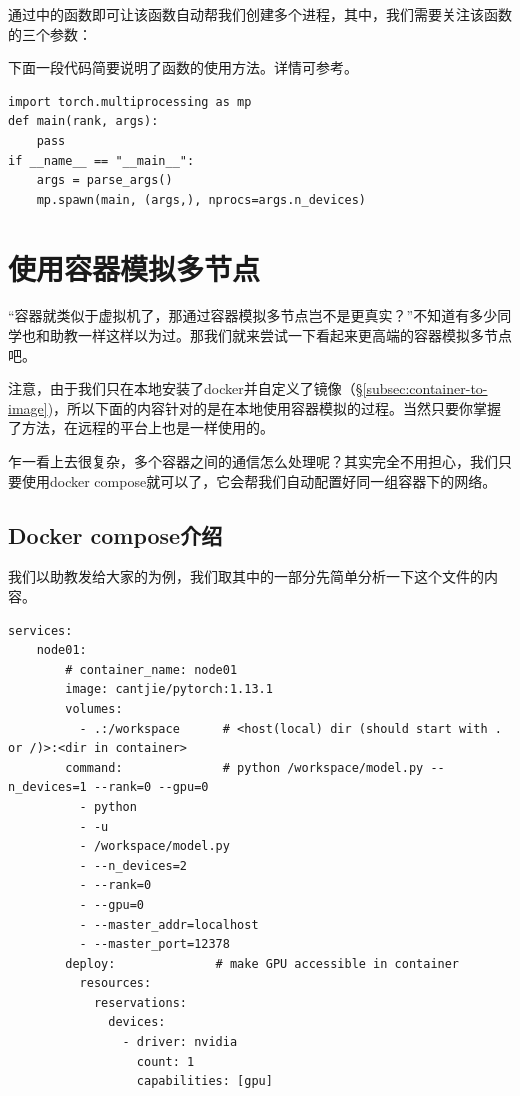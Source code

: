 通过中的函数即可让该函数自动帮我们创建多个进程，其中，我们需要关注该函数的三个参数：

下面一段代码简要说明了函数的使用方法。详情可参考。
\begin{lstlisting}
import torch.multiprocessing as mp
def main(rank, args):
    pass
if __name__ == "__main__":
    args = parse_args()
    mp.spawn(main, (args,), nprocs=args.n_devices)
\end{lstlisting}

\section{使用容器模拟多节点}

“容器就类似于虚拟机了，那通过容器模拟多节点岂不是更真实？”不知道有多少同学也和助教一样这样以为过。那我们就来尝试一下看起来更高端的容器模拟多节点吧。

注意，由于我们只在本地安装了docker并自定义了镜像（\S\ref{subsec:container-to-image})，所以下面的内容针对的是在本地使用容器模拟的过程。当然只要你掌握了方法，在远程的平台上也是一样使用的。

乍一看上去很复杂，多个容器之间的通信怎么处理呢？其实完全不用担心，我们只要使用docker compose就可以了，它会帮我们自动配置好同一组容器下的网络。

\subsection{Docker compose介绍}

我们以助教发给大家的为例，我们取其中的一部分先简单分析一下这个文件的内容。
\begin{lstlisting}
services:
    node01:           
        # container_name: node01
        image: cantjie/pytorch:1.13.1
        volumes:
          - .:/workspace      # <host(local) dir (should start with . or /)>:<dir in container>
        command:              # python /workspace/model.py --n_devices=1 --rank=0 --gpu=0
          - python
          - -u
          - /workspace/model.py 
          - --n_devices=2
          - --rank=0
          - --gpu=0
          - --master_addr=localhost
          - --master_port=12378
        deploy:              # make GPU accessible in container
          resources:
            reservations:
              devices:
                - driver: nvidia
                  count: 1
                  capabilities: [gpu]
\end{lstlisting}


